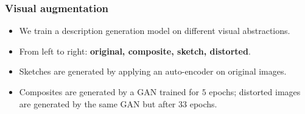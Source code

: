 \documentclass[aspectratio=1610]{beamer} %
\begin{document}
\begin{frame}
\frametitle{Visual augmentation}
\begin{figure}[htbp]
\centering
{}
\label{fig:generalexample}
\end{figure}
\begin{itemize}
	\item We train a description generation model on different visual abstractions. %
	\item From left to right: \textbf{original, composite, sketch, distorted}.
	\item Sketches are generated by applying an auto-encoder on original images.
	\item Composites are generated by a GAN trained for $5$ epochs; distorted images are generated by the same GAN but after $33$ epochs.
\end{itemize}
\end{frame}
\end{document}
